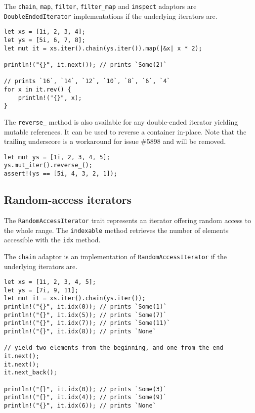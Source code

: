 \documentclass[]{article}
\begin{document}
The \texttt{chain}, \texttt{map}, \texttt{filter}, \texttt{filter\_map}
and \texttt{inspect} adaptors are \texttt{DoubleEndedIterator}
implementations if the underlying iterators are.

\begin{verbatim}
let xs = [1i, 2, 3, 4];
let ys = [5i, 6, 7, 8];
let mut it = xs.iter().chain(ys.iter()).map(|&x| x * 2);

println!("{}", it.next()); // prints `Some(2)`

// prints `16`, `14`, `12`, `10`, `8`, `6`, `4`
for x in it.rev() {
    println!("{}", x);
}
\end{verbatim}

The \texttt{reverse\_} method is also available for any double-ended
iterator yielding mutable references. It can be used to reverse a
container in-place. Note that the trailing underscore is a workaround
for issue \#5898 and will be removed.

\begin{verbatim}
let mut ys = [1i, 2, 3, 4, 5];
ys.mut_iter().reverse_();
assert!(ys == [5i, 4, 3, 2, 1]);
\end{verbatim}

\subsection{Random-access iterators}\label{random-access-iterators}

The \texttt{RandomAccessIterator} trait represents an iterator offering
random access to the whole range. The \texttt{indexable} method
retrieves the number of elements accessible with the \texttt{idx}
method.

The \texttt{chain} adaptor is an implementation of
\texttt{RandomAccessIterator} if the underlying iterators are.

\begin{verbatim}
let xs = [1i, 2, 3, 4, 5];
let ys = [7i, 9, 11];
let mut it = xs.iter().chain(ys.iter());
println!("{}", it.idx(0)); // prints `Some(1)`
println!("{}", it.idx(5)); // prints `Some(7)`
println!("{}", it.idx(7)); // prints `Some(11)`
println!("{}", it.idx(8)); // prints `None`

// yield two elements from the beginning, and one from the end
it.next();
it.next();
it.next_back();

println!("{}", it.idx(0)); // prints `Some(3)`
println!("{}", it.idx(4)); // prints `Some(9)`
println!("{}", it.idx(6)); // prints `None`
\end{verbatim}
\end{document}
